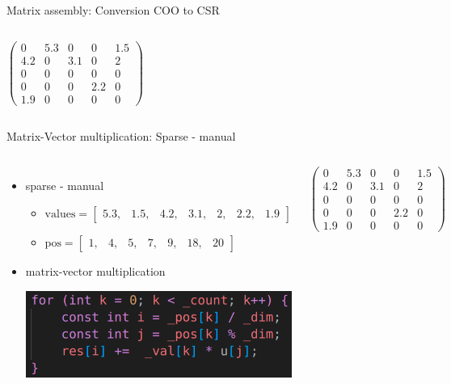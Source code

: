 \documentclass[aspectratio=169,xcolor=dvipsnames]{beamer}
\begin{document}
\begin{frame}{Matrix assembly: Conversion COO to CSR}
\begin{columns}[c]
        
        $ \left( \begin{array}{rrrrr} 
0 & 5.3 & 0 & 0 & 1.5\\ 
4.2 & 0& 3.1 & 0 & 2\\ 
0 & 0 & 0 & 0 & 0 \\
0 & 0 & 0 & 2.2 & 0 \\
1.9 & 0 & 0 & 0 & 0
\end{array} \right) $

    \end{columns}
\end{frame}


\begin{frame}{Matrix-Vector multiplication: Sparse - manual}
    \begin{columns}[c] %

\begin{itemize}
\item sparse - manual
  \begin{itemize}
     	\item $\mathrm{values} =  \begin{bmatrix} 
		5.3, & 1.5, & 4.2, & 3.1, & 2, & 2.2, & 1.9 
		\end{bmatrix}$

		\item $\mathrm{pos} = \begin{bmatrix}
		1, & 4, & 5, & 7, & 9, & 18, & 20 
		\end{bmatrix}$
	\end{itemize}
\item matrix-vector multiplication
\begin{center}
    \includegraphics[width=0.8\linewidth]{matrix_vector_man2.png}
    \end{center}
\end{itemize}

        
        $ \left( \begin{array}{rrrrr} 
0 & 5.3 & 0 & 0 & 1.5\\ 
4.2 & 0& 3.1 & 0 & 2\\ 
0 & 0 & 0 & 0 & 0 \\
0 & 0 & 0 & 2.2 & 0 \\
1.9 & 0 & 0 & 0 & 0
\end{array} \right) $

    \end{columns}
\end{frame}
\end{document}
